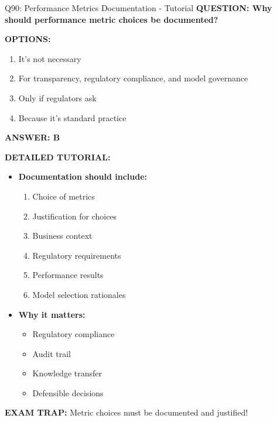 \documentclass[8pt]{beamer}
\begin{document}
\begin{frame}{Q90: Performance Metrics Documentation - Tutorial}
	\fontsize{6.5}{7.5}\selectfont
	\textbf{QUESTION: Why should performance metric choices be documented?}
	
	\vspace{0.1cm}
	\textbf{OPTIONS:}
	\begin{enumerate}
		\item It's not necessary
		\item For transparency, regulatory compliance, and model governance
		\item Only if regulators ask
		\item Because it's standard practice
	\end{enumerate}
	
	\vspace{0.1cm}
	\textcolor{myblue}{\textbf{ANSWER: B}}
	
	\vspace{0.1cm}
	\textbf{DETAILED TUTORIAL:}
	\begin{itemize}
		\item \textbf{Documentation should include:}
		\begin{enumerate}
			\item Choice of metrics
			\item Justification for choices
			\item Business context
			\item Regulatory requirements
			\item Performance results
			\item Model selection rationales
		\end{enumerate}
		\item \textbf{Why it matters:}
		\begin{itemize}
			\item Regulatory compliance
			\item Audit trail
			\item Knowledge transfer
			\item Defensible decisions
		\end{itemize}
	\end{itemize}
	
	\textcolor{myred}{\textbf{EXAM TRAP:}} Metric choices must be \textcolor{myblue}{documented and justified}!
\end{frame}
\end{document}
